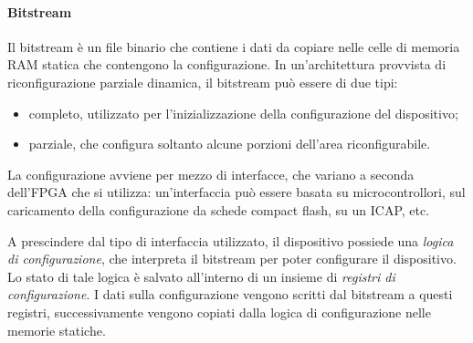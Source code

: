 \paragraph{Bitstream}
Il bitstream è un file binario che contiene i dati da copiare nelle celle di memoria RAM
statica che contengono la configurazione. In un'architettura provvista di
riconfigurazione parziale dinamica, il bitstream può essere di due tipi:
\begin{itemize}
 \item completo, utilizzato per l'inizializzazione della configurazione del dispositivo;
 \item parziale, che configura soltanto alcune porzioni dell'area riconfigurabile.
\end{itemize}

La configurazione avviene per mezzo di interfacce, che variano a seconda dell'\ac{FPGA}
che si utilizza: un'interfaccia può essere basata su microcontrollori, sul caricamento
della configurazione da schede compact flash, su un \ac{ICAP}, etc.

A prescindere dal tipo di interfaccia utilizzato, il dispositivo possiede una
\emph{logica di configurazione}, che interpreta il bitstream per poter configurare
il dispositivo. Lo stato di tale logica è salvato all'interno di un insieme di \emph{registri di configurazione}.
I dati sulla configurazione vengono scritti dal bitstream a questi registri, successivamente
vengono copiati dalla logica di configurazione nelle memorie statiche.


